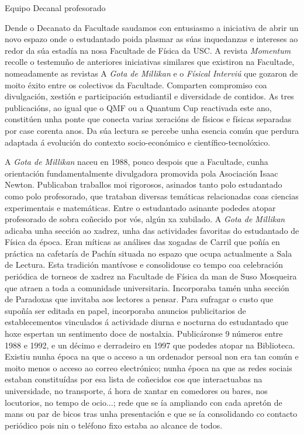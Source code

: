 \Titular*%
{Benvida a \textit{MOMENTUM}}%
{Equipo Decanal}%
{profesorado}%
{}%

\vspace{-1.1cm}

\begin{multicols}{2}

Dende o Decanato da Facultade saudamos con entusiasmo a iniciativa de abrir un
novo espazo onde o estudantado poida plasmar as súas inquedanzas e intereses ao
redor da súa estadía na nosa Facultade de Física da USC. A revista
\textit{Momentum} recolle o testemuño de anteriores iniciativas similares que
existiron na Facultade, nomeadamente as revistas A \textit{Gota de Millikan} e
o \textit{Físical Interviú} que gozaron de moito éxito entre os colectivos da
Facultade. Comparten compromiso coa divulgación, xestión e participación
estudiantil e diversidade de contidos. As tres publicacións, ao igual que o QMF
ou a Quantum Cup reactivada este ano, constitúen unha ponte que conecta varias
xeracións de físicos e físicas separadas por case corenta anos. Da súa lectura
se percebe unha esencia común que perdura adaptada á evolución do contexto
socio-económico e científico-tecnolóxico.

A \textit{Gota de Millikan} naceu en 1988, pouco despois que a Facultade, cunha
orientación fundamentalmente divulgadora promovida pola Asociación Isaac
Newton. Publicaban traballos moi rigorosos, asinados tanto polo estudantado
como polo profesorado, que trataban diversas temáticas relacionadas coas
ciencias experimentais e matemáticas. Entre o estudantado asinante podedes
atopar profesorado de sobra coñecido por vós, algún xa xubilado. A \textit{Gota
de Millikan} adicaba unha sección ao xadrez, unha das actividades favoritas do
estudantado de Física da época. Eran míticas as análises das xogadas de Carril
que poñía en práctica na cafetaría de Pachín situada no espazo que ocupa
actualmente a Sala de Lectura. Esta tradición mantívose e consolidouse co tempo
coa celebración periódica de torneos de xadrez na Facultade de Física da man de
Suso Mosqueira que atraen a toda a comunidade universitaria. Incorporaba tamén
unha sección de Paradoxas que invitaba aos lectores a pensar. Para sufragar o
custo que supoñía ser editada en papel, incorporaba anuncios publicitarios de
establecementos vinculados á actividade diurna e nocturna do estudantado que
hoxe espertan un sentimento doce de nostalxia. Publicáronse 9 números entre
1988 e 1992, e un décimo e derradeiro en 1997 que podedes atopar na Biblioteca.
Existiu nunha época na que o acceso a un ordenador persoal non era tan común e
moito menos o acceso ao correo electrónico; nunha época na que as redes sociais
estaban constituídas por esa lista de coñecidos cos que interactuabas na
universidade, no transporte, á hora de xantar en comedores ou bares, nos
locutorios, no tempo de ocio...; rede que se ía ampliando con cada apretón de
mans ou par de bicos tras unha presentación e que se ía consolidando co
contacto periódico pois nin o teléfono fixo estaba ao alcance de todos.


\end{multicols}
